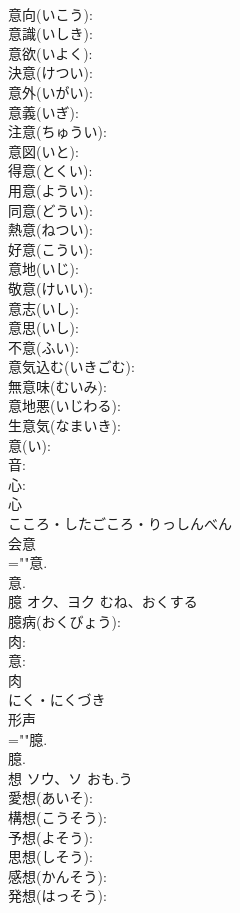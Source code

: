 \documentclass[8pt]{extreport}
\begin{document}
\begin{CJK}{UTF8}{min}
\\	意向(いこう): 
\\	意識(いしき): 
\\	意欲(いよく): 
\\	決意(けつい): 
\\	意外(いがい): 
\\	意義(いぎ): 
\\	注意(ちゅうい): 
\\	意図(いと): 
\\	得意(とくい): 
\\	用意(ようい): 
\\	同意(どうい): 
\\	熱意(ねつい): 
\\	好意(こうい): 
\\	意地(いじ): 
\\	敬意(けいい): 
\\	意志(いし): 
\\	意思(いし): 
\\	不意(ふい): 
\\	意気込む(いきごむ): 
\\	無意味(むいみ): 
\\	意地悪(いじわる): 
\\	生意気(なまいき): 
\\	意(い): 
\\	音: 
\\	心: 
\\	心	
\\	こころ・したごころ・りっしんべん	
\\	会意 
\\	=""意.
\\	意.
\\	臆	オク、ヨク	むね、おくする		
\\	臆病(おくびょう): 
\\	肉: 
\\	意: 
\\	肉	
\\	にく・にくづき	
\\	形声 
\\	=""臆.
\\	臆.
\\	想	ソウ、ソ	おも.う		
\\	愛想(あいそ): 
\\	構想(こうそう): 
\\	予想(よそう): 
\\	思想(しそう): 
\\	感想(かんそう): 
\\	発想(はっそう): 

\end{CJK}
\end{document}
